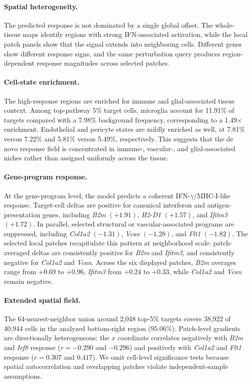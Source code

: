 \documentclass[sigconf,review,balance=false]{acmart}
\begin{document}
\paragraph{Spatial heterogeneity.}
The predicted response is not dominated by a single global offset. The whole-tissue maps identify regions with strong IFN-associated activation, while the local patch panels show that the signal extends into neighboring cells. Different genes show different response signs, and the same perturbation query produces region-dependent response magnitudes across selected patches.

\paragraph{Cell-state enrichment.}
The high-response regions are enriched for immune and glial-associated tissue context. Among top-pathway 5\% target cells, microglia account for 11.91\% of targets compared with a 7.98\% background frequency, corresponding to a 1.49$\times$ enrichment. Endothelial and pericyte states are mildly enriched as well, at 7.81\% versus 7.22\% and 5.81\% versus 5.49\%, respectively. This suggests that the de novo response field is concentrated in immune-, vascular-, and glial-associated niches rather than assigned uniformly across the tissue.

\paragraph{Gene-program response.}
At the gene-program level, the model predicts a coherent IFN-$\gamma$/MHC-I-like response. Target-cell deltas are positive for canonical interferon and antigen-presentation genes, including \textit{B2m} $(+1.91)$, \textit{H2-D1} $(+1.57)$, and \textit{Ifitm3} $(+1.72)$. In parallel, selected structural or vascular-associated programs are suppressed, including \textit{Col1a2} $(-1.31)$, \textit{Vcan} $(-1.28)$, and \textit{Flt1} $(-1.82)$. The selected local patches recapitulate this pattern at neighborhood scale: patch-averaged deltas are consistently positive for \textit{B2m} and \textit{Ifitm3}, and consistently negative for \textit{Col1a2} and \textit{Vcan}. Across the six displayed patches, \textit{B2m} averages range from $+0.69$ to $+0.96$, \textit{Ifitm3} from $+0.24$ to $+0.33$, while \textit{Col1a2} and \textit{Vcan} remain negative.

\paragraph{Extended spatial field.}
The 64-nearest-neighbor union around 2,048 top-5\% targets covers 38,922 of
40,944 cells in the analyzed bottom-right region (95.06\%). Patch-level
gradients are directionally heterogeneous: the $x$ coordinate correlates
negatively with \textit{B2m} and \textit{Irf8} response
($r=-0.290$ and $-0.296$) and positively with \textit{Col1a2} and
\textit{Flt1} response ($r=0.307$ and $0.417$). We omit cell-level
significance tests because spatial autocorrelation and overlapping patches
violate independent-sample assumptions.
\end{document}
